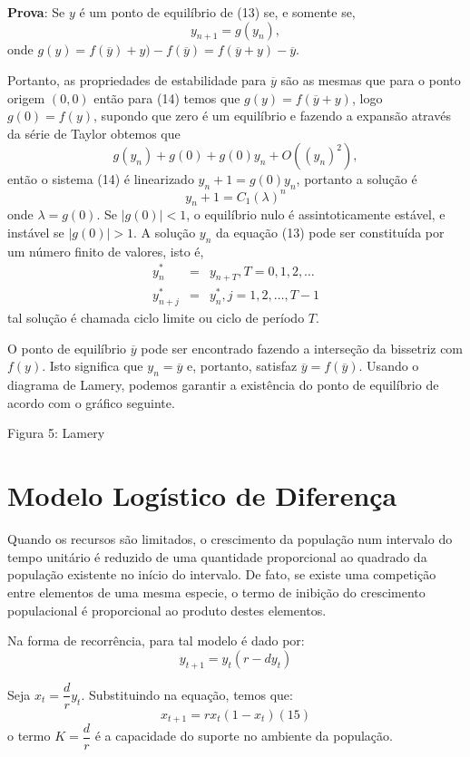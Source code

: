 \textbf{Prova}: Se $y$ é um ponto de equilíbrio de (13) se, e somente se, 
\begin{equation}
y_{n+1} = g(y_{n}),
\end{equation}
onde $g(y) = f(\overline{y}) + y)-f(\overline{y}) = f(\overline{y} + y) - \overline{y}$.

Portanto, as propriedades de estabilidade para $\overline{y}$ são as mesmas que para o ponto origem $(0,0)$ então para (14) temos que $g(y) = f(\overline{y} +y)$, logo $g(0) = f(y)$, supondo que zero é um equilíbrio e fazendo a expansão através da série de Taylor obtemos que 
$$g(y_{n}) + g(0) + g (0)y_{n} + O((y_{n})^2),$$
então o sistema (14) é linearizado $y_{n}+1 = g(0)y_{n}$, portanto a solução é 
$$y_{n}+1 = C_1(\lambda)^n$$
onde $\lambda = g(0)$. Se $|g(0)|< 1$, o equilíbrio nulo é assintoticamente estável, e instável se $|g(0)|> 1$. A solução $y_{n}$ da equação (13) pode ser constituída por um número finito de valores, isto é,
$$\begin{array}{rcl}
y_n^\ast &=& y_{n+T}, T = 0, 1, 2, \ldots \\
y_{n+j}^\ast &=& y_n^\ast, j = 1, 2, \ldots, T-1
\end{array}$$
tal solução é chamada ciclo limite ou ciclo de período $T$. 

O ponto de equilíbrio $\overline{y}$ pode ser encontrado fazendo a interseção da bissetriz com $f(y)$. Isto significa que $y_{n} = \overline{y}$ e, portanto, satisfaz $\overline{y} = f(\overline{y})$. Usando o diagrama de Lamery, podemos garantir a existência do ponto de equilíbrio de acordo com o gráfico seguinte.

Figura 5: Lamery 

\section{Modelo Logístico de Diferença}

Quando os recursos são limitados, o crescimento da população num intervalo do tempo unitário é reduzido de uma quantidade proporcional ao quadrado da população existente no início do intervalo. De fato, se existe uma competição entre elementos de uma mesma especie, o termo de inibição do crescimento populacional é proporcional ao produto destes elementos. 

Na forma de recorrência, para tal modelo é dado por: 
$$y_{t+1} = y_{t}(r-dy_{t})$$

Seja $x_{t} = \dfrac{d}{r} y_{t}$. Substituindo na equação, temos que:
\begin{equation}
x_{t+1} = rx_{t}(1 - x_{t}) (15) 
\end{equation}
o termo $K = \dfrac{d}{r}$ é a capacidade do suporte no ambiente da população. 


